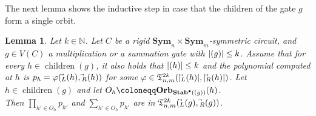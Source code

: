 \documentclass[10pt,a4paper]{article}
\theoremstyle{definition}
\theoremstyle{plain}
\newtheorem{lemma}[definition]{Lemma}
\theoremstyle{remark}
\renewcommand{\phi}{\varphi}
\newcommand{\Sym}{\mathbf{Sym}}
\newcommand{\Stab}{\mathbf{Stab}}
\newcommand{\StabP}{\Stab^{\bullet}}
\newcommand{\Orb}{\mathbf{Orb}}
\DeclareMathOperator{\child}{children}
\newcommand{\bbN}{\mathbb{N}}
\let\sup\relax
\DeclareMathOperator{\sup}{sup}
\begin{document}
 	The next lemma shows the inductive step in case that the children of the gate $g$ form a single orbit.
 	\begin{lemma}
 		\label{lem:productOfOneChildOrbit}
 		Let $k \in \bbN$.
 		Let $C$ be a rigid $\Sym_{n} \times \Sym_{m}$-symmetric circuit, and $g \in V(C)$ a multiplication or a summation gate with $|\sup(g)| \leq k$.
 		Assume that for every $h \in \child(g)$, it also holds
                that $|\sup(h)| \leq k$ and the polynomial computed at $h$ is $p_h = \phi(\vec{\sup}_L(h), \vec{\sup}_R(h))$ for some $\phi \in \mathfrak{T}^{2k}_{n,m}(|\vec{\sup}_L(h)|, |\vec{\sup}_R(h)|)$.
 		Let $h \in \child(g)$ and let $O_h \coloneqq \Orb_{\StabP(\sup(g))}(h)$.\\
 		Then $\prod_{h' \in O_h} p_{h'}$ and $\sum_{h' \in O_h} p_{h'}$ are in $\mathfrak{T}_{n,m}^{2k}(\vec{\sup}_L(g), \vec{\sup}_R(g))$.
 	\end{lemma}	
\end{document}
